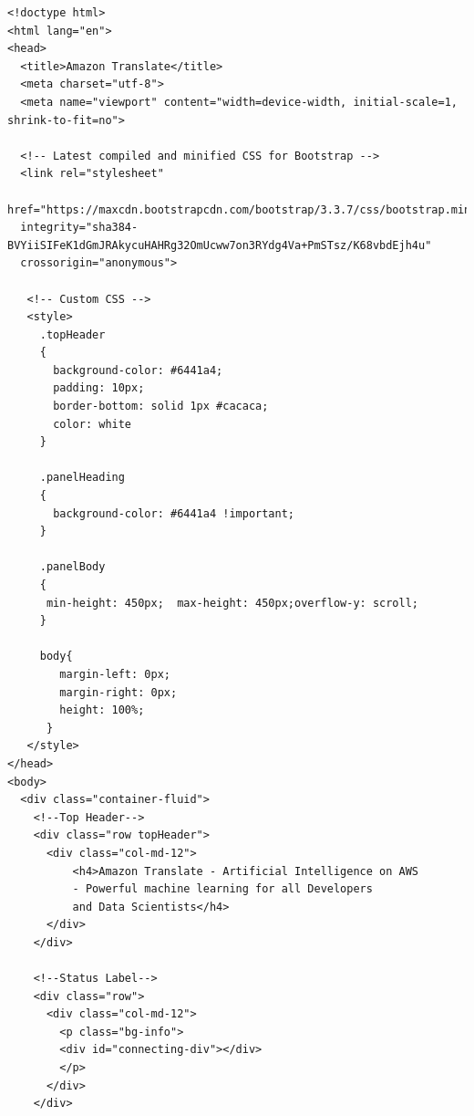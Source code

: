 \documentclass[runningheads]{llncs}
\begin{document}
    \small{
\begin{verbatim}
<!doctype html>
<html lang="en">
<head>
  <title>Amazon Translate</title>
  <meta charset="utf-8">
  <meta name="viewport" content="width=device-width, initial-scale=1, shrink-to-fit=no">

  <!-- Latest compiled and minified CSS for Bootstrap -->
  <link rel="stylesheet"
  href="https://maxcdn.bootstrapcdn.com/bootstrap/3.3.7/css/bootstrap.min.css"
  integrity="sha384-BVYiiSIFeK1dGmJRAkycuHAHRg32OmUcww7on3RYdg4Va+PmSTsz/K68vbdEjh4u" 
  crossorigin="anonymous">

   <!-- Custom CSS -->
   <style>
     .topHeader
     {
       background-color: #6441a4;
       padding: 10px;
       border-bottom: solid 1px #cacaca;
       color: white
     }

     .panelHeading
     {
       background-color: #6441a4 !important;
     }

     .panelBody
     {
      min-height: 450px;  max-height: 450px;overflow-y: scroll;
     }

     body{
        margin-left: 0px;
        margin-right: 0px;
        height: 100%;
      }
   </style>
</head>
<body>
  <div class="container-fluid">
    <!--Top Header-->
    <div class="row topHeader">
      <div class="col-md-12">
          <h4>Amazon Translate - Artificial Intelligence on AWS
          - Powerful machine learning for all Developers 
          and Data Scientists</h4>
      </div>
    </div>

    <!--Status Label-->
    <div class="row">
      <div class="col-md-12">
        <p class="bg-info">
        <div id="connecting-div"></div>
        </p>
      </div>
    </div>


\end{verbatim}}
\end{document}
